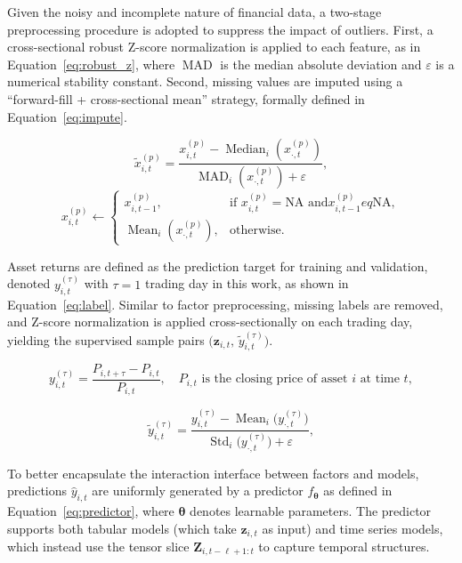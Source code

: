 \documentclass{article}
\begin{document}
Given the noisy and incomplete nature of financial data, a two-stage preprocessing procedure is adopted to suppress the impact of outliers. First, a cross-sectional robust Z-score normalization is applied to each feature, as in Equation~\eqref{eq:robust_z}, where $\operatorname{MAD}$ is the median absolute deviation and $\varepsilon$ is a numerical stability constant. Second, missing values are imputed using a “forward-fill + cross-sectional mean” strategy, formally defined in Equation~\eqref{eq:impute}.

\begin{equation}
\tilde{x}^{(p)}_{i,t}=\frac{x^{(p)}_{i,t}-\operatorname{Median}_i\!\left(x^{(p)}_{\cdot,t}\right)}{\operatorname{MAD}_i\!\left(x^{(p)}_{\cdot,t}\right)+\varepsilon},
\label{eq:robust_z}
\end{equation}
\begin{equation}
x^{(p)}_{i,t}\leftarrow\begin{cases}
x^{(p)}_{i,t-1}, & \text{if }x^{(p)}_{i,t}=\text{NA and
}x^{(p)}_{i,t-1}
eq\text{NA},\\[4pt]
\operatorname{Mean}_i\!\left(x^{(p)}_{\cdot,t}\right), & \text{otherwise}.
\end{cases}
\label{eq:impute}
\end{equation}

Asset returns are defined as the prediction target for training and validation, denoted $y_{i,t}^{(\tau)}$ with $\tau=1$ trading day in this work, as shown in Equation~\eqref{eq:label}. Similar to factor preprocessing, missing labels are removed, and Z-score normalization is applied cross-sectionally on each trading day, yielding the supervised sample pairs $\bigl(\mathbf{z}_{i,t},\,\tilde{y}_{i,t}^{(\tau)}\bigr)$.

\begin{equation}
y_{i,t}^{(\tau)}=\frac{P_{i,t+\tau}-P_{i,t}}{P_{i,t}},\quad P_{i,t} \text{ is the closing price of asset } i \text{ at time } t,
\label{eq:label}
\end{equation}

\begin{equation}
\tilde{y}_{i,t}^{(\tau)}
=\frac{y_{i,t}^{(\tau)}-\operatorname{Mean}_i\!\bigl(y_{\cdot,t}^{(\tau)}\bigr)}{\operatorname{Std}_i\!\bigl(y_{\cdot,t}^{(\tau)}\bigr)+\varepsilon},
\label{eq:csznorm}
\end{equation}

To better encapsulate the interaction interface between factors and models, predictions $\hat{y}_{i,t}$ are uniformly generated by a predictor $f_{\boldsymbol{\theta}}$ as defined in Equation~\eqref{eq:predictor}, where $\boldsymbol{\theta}$ denotes learnable parameters. The predictor supports both tabular models (which take $\mathbf{z}_{i,t}$ as input) and time series models, which instead use the tensor slice $\mathbf{Z}_{i,t-\ell+1:t}$ to capture temporal structures.
\end{document}
